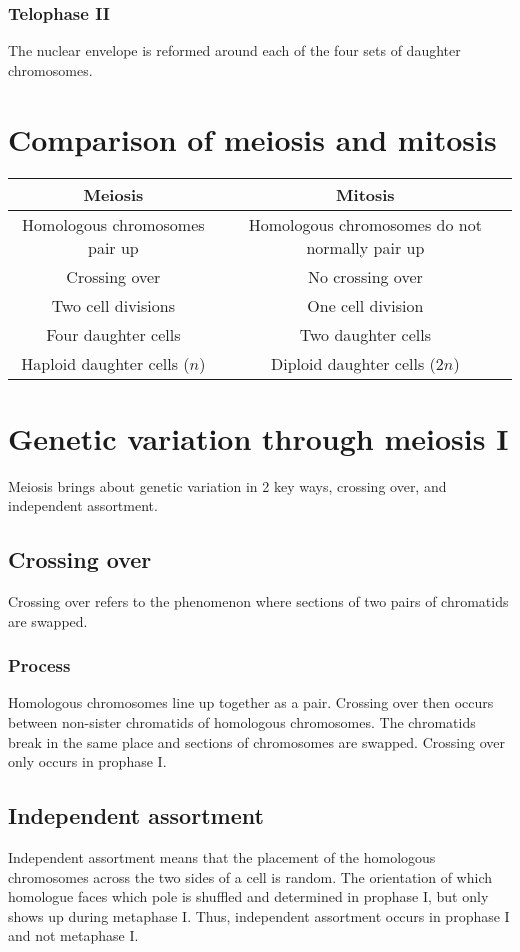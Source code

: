 \documentclass[11pt]{article}
\begin{document}
\subsubsection{Telophase II}
\label{sec:orgd5ddb36}
The nuclear envelope is reformed around each of the four sets of daughter chromosomes.


\section{Comparison of meiosis and mitosis}
\label{sec:orgf581d49}
\begin{center}
\begin{tabular}{c|c}
\textbf{Meiosis} & \textbf{Mitosis} \\
\hline
Homologous chromosomes pair up & Homologous chromosomes do not normally pair up \\
Crossing over & No crossing over \\
Two cell divisions & One cell division \\
Four daughter cells & Two daughter cells \\
Haploid daughter cells ($n$) & Diploid daughter cells ($2n$)
\end{tabular}
\end{center}


\section{Genetic variation through meiosis I}
\label{sec:orgfe4c2e2}
Meiosis brings about genetic variation in 2 key ways, crossing over, and independent assortment.

\subsection{Crossing over}
\label{sec:org5ddf0f9}
Crossing over refers to the phenomenon where sections of two pairs of chromatids are swapped.

\subsubsection{Process}
\label{sec:org59aa424}
Homologous chromosomes line up together as a pair. Crossing over then occurs between non-sister chromatids of homologous chromosomes. The chromatids break in the same place and sections of chromosomes are swapped. Crossing over only occurs in prophase I.

\subsection{Independent assortment}
\label{sec:org092d396}
Independent assortment means that the placement of the homologous chromosomes across the two sides of a cell is random. The orientation of which homologue faces which pole is shuffled and determined in prophase I, but only shows up during metaphase I. Thus, independent assortment occurs in prophase I and not metaphase I.
\end{document}
